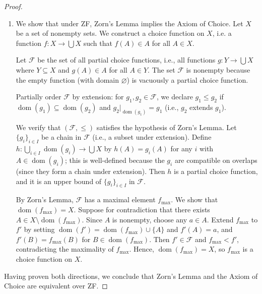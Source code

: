 \begin{proof}
\begin{enumerate}
        Since $s(x) > x$ for all $x \in P$, we have $a_\beta < a_\alpha$ whenever $\beta < \alpha$. Hence, the map $\alpha \mapsto a_\alpha$ is an injective function from the ordinals to $P$. By the , the image of this map is a set, so the ordinals would be a set. This contradicts the  , which asserts that the ordinals form a proper class and therefore cannot be a set. Hence, our assumption that $P$ has no maximal element is false, and $P$ has a maximal element.

        \item We show that under ZF, Zorn's Lemma implies the Axiom of Choice. Let $X$ be a set of nonempty sets. We construct a choice function on $X$, i.e. a function $f: X \to \bigcup X$ such that $f(A) \in A$ for all $A \in X$.

        Let $\mathcal{F}$ be the set of all partial choice functions, i.e., all functions $g: Y \to \bigcup X$ where $Y \subseteq X$ and $g(A) \in A$ for all $A \in Y$. The set $\mathcal{F}$ is nonempty because the empty function (with domain $\varnothing$) is vacuously a partial choice function.

        Partially order $\mathcal{F}$ by extension: for $g_1, g_2 \in \mathcal{F}$, we declare $g_1 \leq g_2$ if $\operatorname{dom}(g_1) \subseteq \operatorname{dom}(g_2)$ and $g_2|_{\operatorname{dom}(g_1)} = g_1$ (i.e., $g_2$ extends $g_1$).

        We verify that $(\mathcal{F}, \leq)$ satisfies the hypothesis of Zorn's Lemma. Let $\{g_i\}_{i \in I}$ be a chain in $\mathcal{F}$ (i.e., a  subset under extension). Define $h: \bigcup_{i \in I} \operatorname{dom}(g_i) \to \bigcup X$ by $h(A) = g_i(A)$ for any $i$ with $A \in \operatorname{dom}(g_i)$; this is well-defined because the $g_i$ are compatible on overlaps (since they form a chain under extension). Then $h$ is a partial choice function, and it is an upper bound of $\{g_i\}_{i \in I}$ in $\mathcal{F}$.

        By Zorn's Lemma, $\mathcal{F}$ has a maximal element $f_{\max}$. We show that $\operatorname{dom}(f_{\max}) = X$. Suppose for contradiction that there exists $A \in X \setminus \operatorname{dom}(f_{\max})$. Since $A$ is nonempty, choose any $a \in A$. Extend $f_{\max}$ to $f'$ by setting $\operatorname{dom}(f') = \operatorname{dom}(f_{\max}) \cup \{A\}$ and $f'(A) = a$, and $f'(B) = f_{\max}(B)$ for $B \in \operatorname{dom}(f_{\max})$. Then $f' \in \mathcal{F}$ and $f_{\max} < f'$, contradicting the maximality of $f_{\max}$. Hence, $\operatorname{dom}(f_{\max}) = X$, so $f_{\max}$ is a choice function on $X$.
    \end{enumerate}

    Having proven both directions, we conclude that Zorn's Lemma and the Axiom of Choice are equivalent over ZF.
\end{proof}